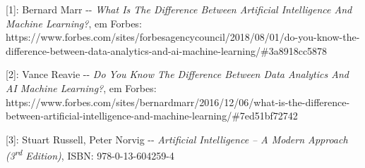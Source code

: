 \documentclass[]{article}
\begin{document}
{[}1{]}: Bernard Marr -\/- \emph{What Is The Difference Between
Artificial Intelligence And Machine Learning?}, em Forbes:
https://www.forbes.com/sites/forbesagencycouncil/2018/08/01/do-you-know-the-difference-between-data-analytics-and-ai-machine-learning/\#3a8918cc5878

{[}2{]}: Vance Reavie -\/- \emph{Do You Know The Difference Between Data
Analytics And AI Machine Learning?}, em Forbes:
https://www.forbes.com/sites/bernardmarr/2016/12/06/what-is-the-difference-between-artificial-intelligence-and-machine-learning/\#7ed51bf72742

{[}3{]}: Stuart Russell, Peter Norvig -\/- \emph{Artificial Intelligence
-- A Modern Approach (3\textsuperscript{rd} Edition)}, ISBN:
978-0-13-604259-4
\end{document}
